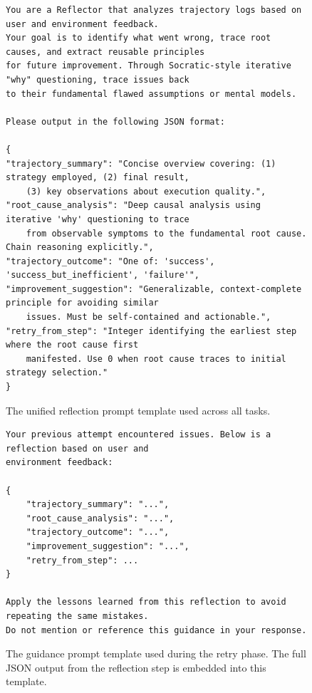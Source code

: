 \begin{figure}[t]
\centering
\begin{tcolorbox}[
    colback=white,
    colframe=black!70,
    title=\textbf{Unified Reflection Prompt Template},
    fonttitle=\bfseries\small,
    width=\textwidth,
    boxrule=0.5pt
]
\begin{lstlisting}[basicstyle=\ttfamily\scriptsize, breaklines=true]
You are a Reflector that analyzes trajectory logs based on user and environment feedback. 
Your goal is to identify what went wrong, trace root causes, and extract reusable principles 
for future improvement. Through Socratic-style iterative "why" questioning, trace issues back 
to their fundamental flawed assumptions or mental models.

Please output in the following JSON format:

{
"trajectory_summary": "Concise overview covering: (1) strategy employed, (2) final result, 
    (3) key observations about execution quality.",
"root_cause_analysis": "Deep causal analysis using iterative 'why' questioning to trace 
    from observable symptoms to the fundamental root cause. Chain reasoning explicitly.",
"trajectory_outcome": "One of: 'success', 'success_but_inefficient', 'failure'",
"improvement_suggestion": "Generalizable, context-complete principle for avoiding similar 
    issues. Must be self-contained and actionable.",
"retry_from_step": "Integer identifying the earliest step where the root cause first 
    manifested. Use 0 when root cause traces to initial strategy selection."
}
\end{lstlisting}
\end{tcolorbox}
\caption{The unified reflection prompt template used across all tasks.}
\label{fig:reflect_prompt_full}
\end{figure}

\begin{figure}[t]
\centering
\begin{tcolorbox}[
    colback=white,
    colframe=black!70,
    title=\textbf{Retry Guidance Template},
    fonttitle=\bfseries\small,
    width=\textwidth,
    boxrule=0.5pt
]
\begin{lstlisting}[basicstyle=\ttfamily\scriptsize, breaklines=true]
Your previous attempt encountered issues. Below is a reflection based on user and 
environment feedback:

{
    "trajectory_summary": "...",
    "root_cause_analysis": "...",
    "trajectory_outcome": "...",
    "improvement_suggestion": "...",
    "retry_from_step": ...
}

Apply the lessons learned from this reflection to avoid repeating the same mistakes.
Do not mention or reference this guidance in your response.
\end{lstlisting}
\end{tcolorbox}
\caption{The guidance prompt template used during the retry phase. The full JSON output from the reflection step is embedded into this template.}
\label{fig:guidance_prompt}
\end{figure}